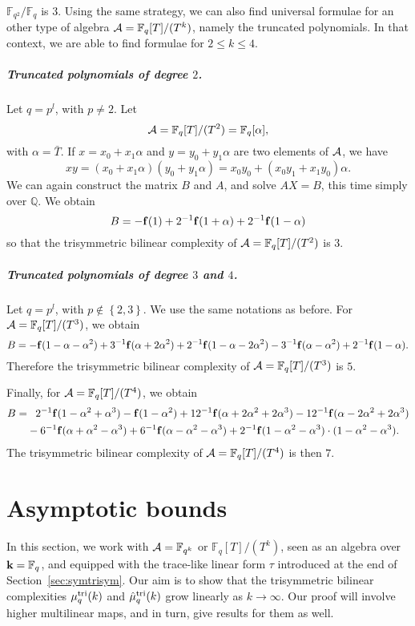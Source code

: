 \documentclass[11pt]{article}
\begin{document}
$\mathbb{F}_{q^2}/\mathbb{F}_{q}$ is $3$. Using the same strategy, we can also
find universal formulae for an other type of algebra $\mathcal{A} =
\mathbb{F}_{q}[T]/(T^k)$, namely the truncated polynomials. In that context, we
are able to find formulae for $2\leq k \leq 4$.
\subparagraph{Truncated polynomials of degree $2$.} Let $q=p^l$, with $p\neq2$. Let
\[
  \mathcal{A} = \mathbb{F}_{q}[T]/(T^2) = \mathbb{F}_q[\alpha],
\]
with $\alpha=\bar T$. If $x =
x_0 + x_1\alpha$ and $y = y_0 + y_1\alpha$ are two elements of
$\mathcal{A}$, we have
\[
  xy = (x_0+x_1\alpha)(y_0+y_1\alpha)=x_0y_0+
  (x_0y_1+x_1y_0)\alpha.
\]
We can again construct the matrix $B$ and $A$, and solve $AX=B$, this time
simply over
$\mathbb{Q}$. We obtain
\[
  B = -\mathbf{f}(1) + 2^{-1}\mathbf{f}(1+\alpha)+2^{-1}\mathbf{f}(1-\alpha)
\]
so that the trisymmetric bilinear complexity of
$\mathcal{A}=\mathbb{F}_q[T]/(T^2)$ is $3$.
\subparagraph{Truncated polynomials of degree $3$ and $4$.} Let $q=p^l$, with
$p\notin\left\{ 2, 3 \right\}$. We use the same notations as before. For
$\mathcal{A}=\mathbb{F}_{q}[T]/(T^3)$, we obtain
\[
  B =
  -\mathbf{f}(1-\alpha-\alpha^2)+3^{-1}\mathbf{f}(\alpha+2\alpha^2)
  +2^{-1}\mathbf{f}(1-\alpha-2\alpha^2) -
  3^{-1}\mathbf{f}(\alpha-\alpha^2)
  +2^{-1}\mathbf{f}(1-\alpha).
\]
Therefore the trisymmetric bilinear complexity of
$\mathcal{A}=\mathbb{F}_q[T]/(T^3)$ is $5$.

Finally, for $\mathcal{A}=\mathbb{F}_{q}[T]/(T^4)$, we obtain
\begin{equation*}
  \begin{split}
    B =&\phantom{-}2^{-1}\mathbf{f}(1-\alpha^2+\alpha^3)-\mathbf{f}(1-\alpha^2)
  +12^{-1}\mathbf{f}(\alpha+2\alpha^2+2\alpha^3)
  -12^{-1}\mathbf{f}(\alpha-2\alpha^2+2\alpha^3)\\
  &-6^{-1}\mathbf{f}(\alpha+\alpha^2-\alpha^3)
  +6^{-1}\mathbf{f}(\alpha-\alpha^2-\alpha^3)
  +2^{-1}\mathbf{f}(1-\alpha^2-\alpha^3)\cdot(1-\alpha^2-\alpha^3).
  \end{split}
\end{equation*}
The trisymmetric bilinear complexity of $\mathcal{A}=\mathbb{F}_q[T]/(T^4)$ is then $7$.


\section{Asymptotic bounds}
\label{sec:asymptotic}
In this section, we work with $\mathcal{A}=\mathbb{F}_{q^k}$ or $\mathbb{F}_q[T]/(T^k)$, seen as an algebra over $\mathbf{k}=\mathbb{F}_q$, and equipped with the trace-like linear form $\tau$ introduced at the end of Section~\ref{sec:symtrisym}.
Our aim is to show that the trisymmetric bilinear complexities $\mu^{\textrm{tri}}_q(k)$ and $\hat\mu^{\textrm{tri}}_q(k)$ grow linearly as $k\to\infty$.
Our proof will involve higher multilinear maps, and in turn, give results for them as well.
\end{document}
